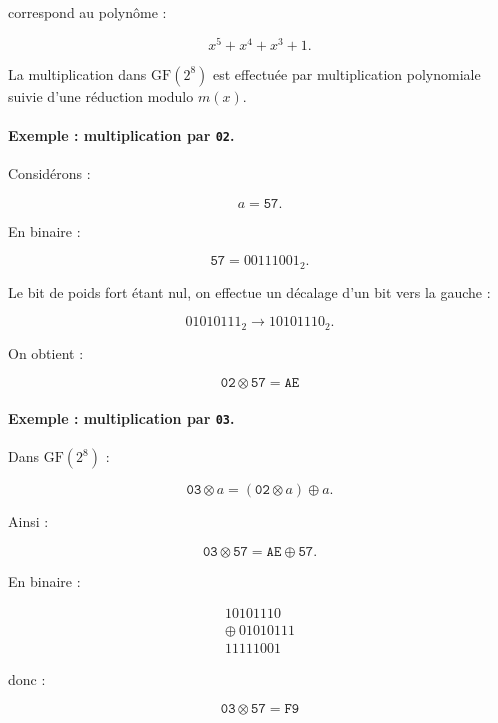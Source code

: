 \documentclass[12pt,a4paper]{article}
\begin{document}
correspond au polynôme :

\[
x^5+x^4+x^3+1.
\]

La multiplication dans $\mathrm{GF}(2^8)$ est effectuée par
multiplication polynomiale suivie d'une réduction modulo $m(x)$.



\paragraph{Exemple : multiplication par \texttt{02}.}

Considérons :

\[
a=\texttt{57}.
\]

En binaire :

\[
\texttt{57}=00111001_2.
\]

Le bit de poids fort étant nul, on effectue un décalage d'un bit
vers la gauche :

\[
01010111_2
\longrightarrow
10101110_2.
\]

On obtient :

\[
\boxed{
\texttt{02}\otimes\texttt{57}=\texttt{AE}
}
\]



\paragraph{Exemple : multiplication par \texttt{03}.}

Dans $\mathrm{GF}(2^8)$ :

\[
\texttt{03}\otimes a
=
(\texttt{02}\otimes a)\oplus a.
\]

Ainsi :

\[
\texttt{03}\otimes\texttt{57}
=
\texttt{AE}\oplus\texttt{57}.
\]

En binaire :

\[
\begin{array}{c}
10101110\\
\oplus\ 01010111\\
\hline
11111001
\end{array}
\]

donc :

\[
\boxed{
\texttt{03}\otimes\texttt{57}=\texttt{F9}
}
\]
\end{document}
